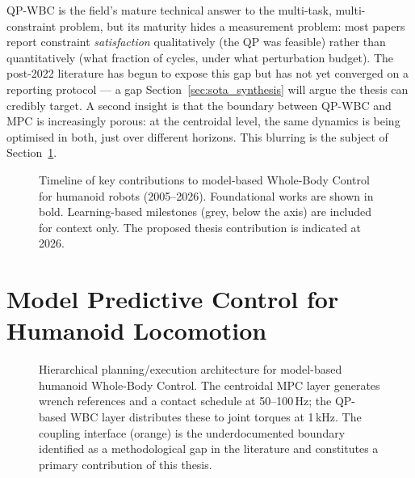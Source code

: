 \begin{criticalinsight}
QP-WBC is the field's mature technical answer to the multi-task,
multi-constraint problem, but its maturity hides a measurement problem:
most papers report constraint \emph{satisfaction} qualitatively (the QP
was feasible) rather than quantitatively (what fraction of cycles, under
what perturbation budget). The post-2022 literature has begun to expose
this gap \cite{LeCleach2024,Smaldone2025} but has not yet converged on a
reporting protocol --- a gap Section~\ref{sec:sota_synthesis} will argue
the thesis can credibly target. A second insight is that the boundary
between QP-WBC and MPC is increasingly porous: at the centroidal level,
the same dynamics is being optimised in both, just over different
horizons. This blurring is the subject of Section~\ref{sec:sota_mpc}.
\end{criticalinsight}



\begin{figure}[htbp]
  \centering
  \singlespacing
  \resizebox{\textwidth}{!}{}
  \caption{Timeline of key contributions to model-based Whole-Body Control
           for humanoid robots (2005--2026). Foundational works are shown in
           bold. Learning-based milestones (grey, below the axis) are included
           for context only. The proposed thesis contribution is indicated at 2026.}
  \label{fig:wbc_timeline}
\end{figure}

\section{Model Predictive Control for Humanoid Locomotion}
\label{sec:sota_mpc}

\begin{figure}[htbp]
  \centering
  \singlespacing
  
  \caption{Hierarchical planning/execution architecture for model-based humanoid
           Whole-Body Control. The centroidal MPC layer generates wrench references
           and a contact schedule at 50--100\,Hz; the QP-based WBC layer distributes
           these to joint torques at 1\,kHz. The coupling interface (orange) is the
           underdocumented boundary identified as a methodological gap in the
           literature and constitutes a primary contribution of this thesis.}
  \label{fig:wbc_architecture}
\end{figure}


